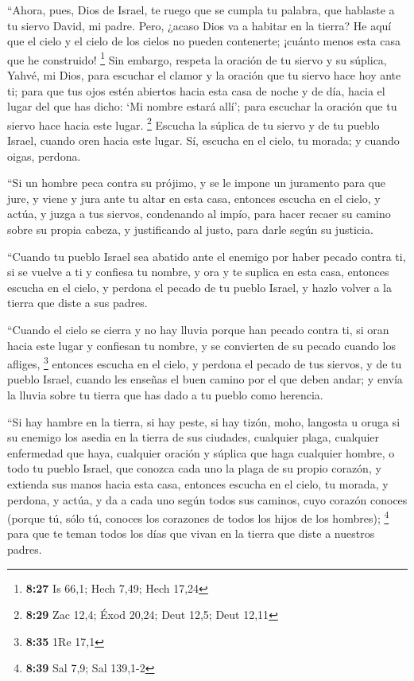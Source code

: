 \begin{paracol}{2}
 ``Ahora, pues, Dios de Israel, te ruego que se cumpla tu
palabra, que hablaste a tu siervo David, mi padre.  Pero,
¿acaso Dios va a habitar en la tierra? He aquí que el cielo y el cielo
de los cielos no pueden contenerte; ¡cuánto menos esta casa que he
construido! \footnote{\textbf{8:27} Is 66,1; Hech 7,49; Hech 17,24}
 Sin embargo, respeta la oración de tu siervo y su
súplica, Yahvé, mi Dios, para escuchar el clamor y la oración que tu
siervo hace hoy ante ti;  para que tus ojos estén
abiertos hacia esta casa de noche y de día, hacia el lugar del que has
dicho: `Mi nombre estará allí'; para escuchar la oración que tu siervo
hace hacia este lugar. \footnote{\textbf{8:29} Zac 12,4; Éxod 20,24;
  Deut 12,5; Deut 12,11}  Escucha la súplica de tu siervo
y de tu pueblo Israel, cuando oren hacia este lugar. Sí, escucha en el
cielo, tu morada; y cuando oigas, perdona.

 ``Si un hombre peca contra su prójimo, y se le impone un
juramento para que jure, y viene y jura ante tu altar en esta casa,
 entonces escucha en el cielo, y actúa, y juzga a tus
siervos, condenando al impío, para hacer recaer su camino sobre su
propia cabeza, y justificando al justo, para darle según su justicia.

 ``Cuando tu pueblo Israel sea abatido ante el enemigo
por haber pecado contra ti, si se vuelve a ti y confiesa tu nombre, y
ora y te suplica en esta casa,  entonces escucha en el
cielo, y perdona el pecado de tu pueblo Israel, y hazlo volver a la
tierra que diste a sus padres.

 ``Cuando el cielo se cierra y no hay lluvia porque han
pecado contra ti, si oran hacia este lugar y confiesan tu nombre, y se
convierten de su pecado cuando los afliges, \footnote{\textbf{8:35} 1Re
  17,1}  entonces escucha en el cielo, y perdona el
pecado de tus siervos, y de tu pueblo Israel, cuando les enseñas el buen
camino por el que deben andar; y envía la lluvia sobre tu tierra que has
dado a tu pueblo como herencia.

 ``Si hay hambre en la tierra, si hay peste, si hay
tizón, moho, langosta u oruga si su enemigo los asedia en la tierra de
sus ciudades, cualquier plaga, cualquier enfermedad que haya,
 cualquier oración y súplica que haga cualquier hombre, o
todo tu pueblo Israel, que conozca cada uno la plaga de su propio
corazón, y extienda sus manos hacia esta casa,  entonces
escucha en el cielo, tu morada, y perdona, y actúa, y da a cada uno
según todos sus caminos, cuyo corazón conoces (porque tú, sólo tú,
conoces los corazones de todos los hijos de los hombres); \footnote{\textbf{8:39}
  Sal 7,9; Sal 139,1-2}  para que te teman todos los días
que vivan en la tierra que diste a nuestros padres.


\end{paracol}

